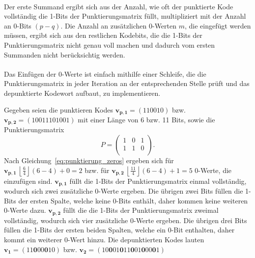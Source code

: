 \\
Der erste Summand ergibt sich aus der Anzahl, wie oft der punktierte Kode vollständig die 1-Bits der Punktierungsmatrix füllt, multipliziert mit der Anzahl an 0-Bits $\left( p-q\right)$. Die Anzahl an zusätzlichen 0-Werten $m$, die eingefügt werden müssen, ergibt sich aus den restlichen Kodebits, die die 1-Bits der Punktierungsmatrix nicht genau voll machen und dadurch vom ersten Summanden nicht berücksichtig werden.
\\
\\
Das Einfügen der 0-Werte ist einfach mithilfe einer Schleife, die die Punktierungsmatrix in jeder Iteration an der entsprechenden Stelle prüft und das depunktierte Kodewort aufbaut, zu implementieren.
\begin{beispiel}
Gegeben seien die punktieren Kodes \mbox{$\mathbf{v_{p,1}}=(110010)$} bzw. \mbox{$\mathbf{v_{p,2}}=(10011101001)$} mit einer Länge von 6 bzw. 11 Bits, sowie die Punktierungsmatrix
\begin{equation*}
P=
\begin{pmatrix}
1 & 0 & 1 \\
1 & 1 & 0 \\
\end{pmatrix}.
\end{equation*}
Nach Gleichung~\eqref{eq:punktierung_zeros} ergeben sich für $\mathbf{v_{p,1}}\ \left\lfloor \frac{6}{4} \right\rfloor \left(6-4\right)+0=2$ bzw. für $\mathbf{v_{p,2}}\ \left\lfloor \frac{11}{4} \right\rfloor \left(6-4\right)+1=5$ 0-Werte, die einzufügen sind. $\mathbf{v_{p,1}}$ füllt die 1-Bits der Punktierungsmatrix einmal vollständig, wodurch sich zwei zusätzliche 0-Werte ergeben. Die übrigen zwei Bits füllen die 1-Bits der ersten Spalte, welche keine 0-Bits enthält, daher kommen keine weiteren 0-Werte dazu. $\mathbf{v_{p,2}}$ füllt die die 1-Bits der Punktierungsmatrix zweimal vollständig, wodurch sich vier zusätzliche 0-Werte ergeben. Die übrigen drei Bits füllen die 1-Bits der ersten beiden Spalten, welche ein 0-Bit enthalten, daher kommt ein weiterer 0-Wert hinzu. Die depunktierten Kodes lauten \mbox{$\mathbf{v_{1}}=(11\mathbf{0}00\mathbf{0}10)$} bzw. \mbox{$\mathbf{v_{2}}=(10\mathbf{0}01\mathbf{0}11\mathbf{0}01\mathbf{0}00\mathbf{0}1)$}
\end{beispiel}

